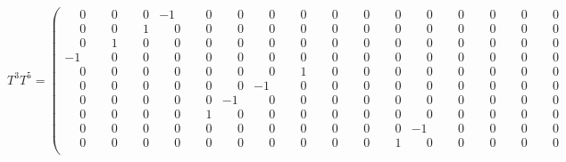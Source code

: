 \documentclass[10pt]{article}
\begin{document}
\[
T^{3}T^{5} = \left(\begin{smallmatrix}
\phantom{-}0 & \phantom{-}0 & \phantom{-}0 & -1 & \phantom{-}0 & \phantom{-}0 & \phantom{-}0 & \phantom{-}0 & \phantom{-}0 & \phantom{-}0 & \phantom{-}0 & \phantom{-}0 & \phantom{-}0 & \phantom{-}0 & \phantom{-}0 & \phantom{-}0 \\
\phantom{-}0 & \phantom{-}0 & \phantom{-}1 & \phantom{-}0 & \phantom{-}0 & \phantom{-}0 & \phantom{-}0 & \phantom{-}0 & \phantom{-}0 & \phantom{-}0 & \phantom{-}0 & \phantom{-}0 & \phantom{-}0 & \phantom{-}0 & \phantom{-}0 & \phantom{-}0 \\
\phantom{-}0 & \phantom{-}1 & \phantom{-}0 & \phantom{-}0 & \phantom{-}0 & \phantom{-}0 & \phantom{-}0 & \phantom{-}0 & \phantom{-}0 & \phantom{-}0 & \phantom{-}0 & \phantom{-}0 & \phantom{-}0 & \phantom{-}0 & \phantom{-}0 & \phantom{-}0 \\
-1 & \phantom{-}0 & \phantom{-}0 & \phantom{-}0 & \phantom{-}0 & \phantom{-}0 & \phantom{-}0 & \phantom{-}0 & \phantom{-}0 & \phantom{-}0 & \phantom{-}0 & \phantom{-}0 & \phantom{-}0 & \phantom{-}0 & \phantom{-}0 & \phantom{-}0 \\
\phantom{-}0 & \phantom{-}0 & \phantom{-}0 & \phantom{-}0 & \phantom{-}0 & \phantom{-}0 & \phantom{-}0 & \phantom{-}1 & \phantom{-}0 & \phantom{-}0 & \phantom{-}0 & \phantom{-}0 & \phantom{-}0 & \phantom{-}0 & \phantom{-}0 & \phantom{-}0 \\
\phantom{-}0 & \phantom{-}0 & \phantom{-}0 & \phantom{-}0 & \phantom{-}0 & \phantom{-}0 & -1 & \phantom{-}0 & \phantom{-}0 & \phantom{-}0 & \phantom{-}0 & \phantom{-}0 & \phantom{-}0 & \phantom{-}0 & \phantom{-}0 & \phantom{-}0 \\
\phantom{-}0 & \phantom{-}0 & \phantom{-}0 & \phantom{-}0 & \phantom{-}0 & -1 & \phantom{-}0 & \phantom{-}0 & \phantom{-}0 & \phantom{-}0 & \phantom{-}0 & \phantom{-}0 & \phantom{-}0 & \phantom{-}0 & \phantom{-}0 & \phantom{-}0 \\
\phantom{-}0 & \phantom{-}0 & \phantom{-}0 & \phantom{-}0 & \phantom{-}1 & \phantom{-}0 & \phantom{-}0 & \phantom{-}0 & \phantom{-}0 & \phantom{-}0 & \phantom{-}0 & \phantom{-}0 & \phantom{-}0 & \phantom{-}0 & \phantom{-}0 & \phantom{-}0 \\
\phantom{-}0 & \phantom{-}0 & \phantom{-}0 & \phantom{-}0 & \phantom{-}0 & \phantom{-}0 & \phantom{-}0 & \phantom{-}0 & \phantom{-}0 & \phantom{-}0 & \phantom{-}0 & -1 & \phantom{-}0 & \phantom{-}0 & \phantom{-}0 & \phantom{-}0 \\
\phantom{-}0 & \phantom{-}0 & \phantom{-}0 & \phantom{-}0 & \phantom{-}0 & \phantom{-}0 & \phantom{-}0 & \phantom{-}0 & \phantom{-}0 & \phantom{-}0 & \phantom{-}1 & \phantom{-}0 & \phantom{-}0 & \phantom{-}0 & \phantom{-}0 & \phantom{-}0 \\

\end{smallmatrix}\]
\end{document}
